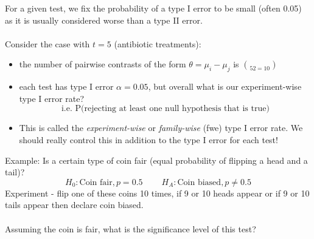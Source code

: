 For a given test, we fix the probability of a type I error to be small (often 0.05) as it is usually considered worse than a type II error.\\~\\
Consider the case with $t=5$ (antibiotic treatments): 
\begin{itemize}
\item the number of pairwise contrasts of the form $\theta=\mu_i-\mu_j$ is $\choose{5}{2}=10$
\item each test has type I error $\alpha=0.05$, but overall what is our experiment-wise type I error rate?
$$\mbox{i.e. P(rejecting at least one null hypothesis that is true)}$$
\item This is called the \textit{experiment-wise} or \textit{family-wise} (fwe) type I error rate.  We should really control this in addition to the type I error for each test!
\end{itemize}

Example:  Is a certain type of coin fair (equal probability of flipping a head and a tail)?
$$H_0: \mbox{Coin fair}, p=0.5~~~~~~~~~~H_A:\mbox{Coin biased}, p\neq 0.5$$
Experiment - flip one of these coins 10 times, if 9 or 10  heads appear or if 9 or 10 tails appear then declare coin biased.\\~\\
Assuming the coin is fair, what is the significance level of this test?

\newpage
 

